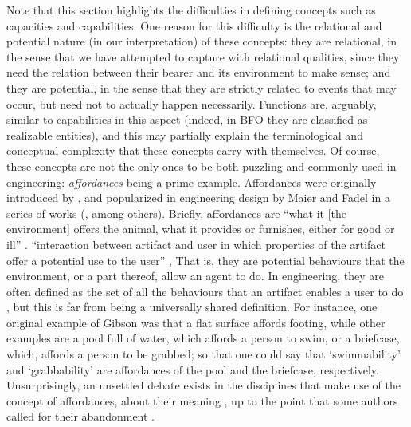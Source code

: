 \documentclass[sw]{iosart2x}
\newcommand{\BFO}{\textsc{BFO}\xspace}
\newcommand{\quotes}[1]{`#1'}
\newcommand{\qquotes}[1]{``#1''}
\begin{document}
Note that this section highlights the difficulties in defining concepts such as capacities and capabilities. 
One reason for this difficulty is the relational and potential nature (in our interpretation) of these concepts: they are relational, in the sense that we have attempted to capture with relational qualities, since they need the relation between their bearer and its environment to make sense; and they are potential, in the sense that they are strictly related to events that may occur, but need not to actually happen necessarily.
Functions are, arguably, similar to capabilities in this aspect (indeed, in \BFO they are classified as realizable entities), and this may partially explain the terminological and conceptual complexity that these concepts carry with themselves. 
Of course, these concepts are not the only ones to be both puzzling and commonly used in engineering: \textit{affordances} being a prime example.
Affordances were originally introduced by \cite{gibsonTheoryAffordances1979}, and popularized in engineering design by Maier and Fadel in a series of works (\cite{maier2001affordance,maierAffordanceBasedDesign2009}, among others).
Briefly, affordances are \qquotes{what it [the environment] offers the animal, what it provides or furnishes, either for good or ill} \cite{gibsonTheoryAffordances1979}. \qquotes{interaction between artifact and user in which properties of the artifact offer a potential use to the user} \cite{maierAffordanceBasedDesign2009}, That is, they are potential behaviours that the environment, or a part thereof, allow an agent to do. 
In engineering, they are often defined as the set of all the behaviours that an artifact enables a user to do \cite{brownRelationshipFunctionAffordance2005}, but this is far from being a universally shared definition.
For instance, one original example of Gibson was that a flat surface affords footing, while other examples are a pool full of water, which affords a person to swim, or a briefcase, which, affords a person to be grabbed; so that one could say that \quotes{swimmability} and \quotes{grabbability} are affordances of the pool and the briefcase, respectively.
Unsurprisingly, an unsettled debate exists in the disciplines that make use of the concept of affordances, about their meaning \cite{brownRelationshipFunctionAffordance2005}, up to the point that some authors called for their abandonment \cite{motaDispensingTheoryPhilosophy2021}.
\end{document}
